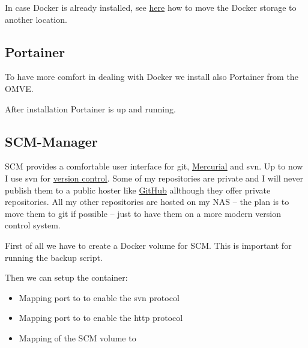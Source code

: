 In case \gls{Docker} is already installed, see \href{https://www.reddit.com/r/OpenMediaVault/comments/fl40gf/moving_docker_storage/}{here}
how to move the \gls{Docker} storage to another location.

\subsection{Portainer}

To have more comfort in dealing with \gls{Docker} we install also \gls{Portainer}
from the \gls{OMVE}.


After installation \gls{Portainer} is up and running.


\subsection{SCM-Manager}

\gls{SCM} provides a comfortable user interface for \gls{git},
\href{https://www.mercurial-scm.org}{Mercurial} and \gls{svn}. Up to now I use
\gls{svn} for \href{https://en.wikipedia.org/wiki/Version_control}{version control}.
Some of my repositories are private and I will never publish them to a public
hoster like \href{https://github.com}{GitHub} allthough they offer private
repositories. All my other repositories are hosted on my \gls{NAS} -- the plan
is to move them to \gls{git} if possible -- just to have them on a more modern
version control system.
\bigbreak

First of all we have to create a \gls{Docker} volume for \gls{SCM}. This is
important for running the backup script.


Then we can setup the container:

\begin{itemize}
    \item Mapping port  to  to enable the \gls{svn} protocol
    \item Mapping port  to  to enable the http protocol
    \item Mapping of the \gls{SCM} volume to 
\end{itemize}


